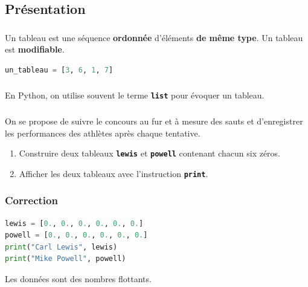 \documentclass[svgnames,11pt]{beamer}
\begin{document}
\subsection{Présentation}
\begin{frame}[fragile]
    \frametitle{}

    \begin{aretenir}[]
        Un tableau est une séquence \textbf{ordonnée} d'éléments \textbf{de même type}. Un tableau est \textbf{modifiable}.
    \end{aretenir}
    \begin{center}
        \begin{lstlisting}[language=Python , basicstyle=\ttfamily\small, xleftmargin=2em, xrightmargin=2em]
un_tableau = [3, 6, 1, 7]
\end{lstlisting}
        \label{CODE}
    \end{center}
\end{frame}
\begin{frame}
    \frametitle{}


    \begin{aretenir}[Remarque]
        En Python, on utilise souvent le terme \textbf{\texttt{list}} pour évoquer un tableau.
    \end{aretenir}

\end{frame}
\begin{frame}
    \frametitle{}
    On se propose de suivre le concours au fur et à mesure des sauts et d'enregistrer les performances des athlètes après chaque tentative.
    \begin{activite}
        \begin{enumerate}
            \item Construire deux tableaux \textbf{\texttt{lewis}} et \textbf{\texttt{powell}} contenant chacun six zéros.
            \item Afficher les deux tableaux avec l'instruction \textbf{\texttt{print}}.
        \end{enumerate}
    \end{activite}

\end{frame}
\begin{frame}[fragile]
    \frametitle{Correction}

    \begin{center}
        \begin{lstlisting}[language=Python , basicstyle=\ttfamily\small, xleftmargin=2em, xrightmargin=2em]
lewis = [0., 0., 0., 0., 0., 0.]
powell = [0., 0., 0., 0., 0., 0.]
print("Carl Lewis", lewis)
print("Mike Powell", powell)
\end{lstlisting}
        \label{CODE}
    \end{center}
    \begin{aretenir}[Remarque]
        Les données sont des nombres flottants.
    \end{aretenir}
\end{frame}
\end{document}
